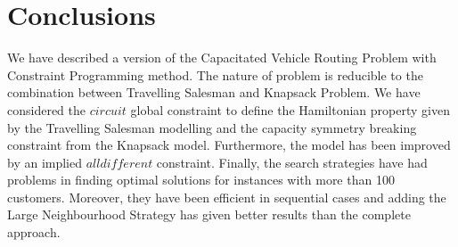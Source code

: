 \chapter{Conclusions}
We have described a version of the Capacitated Vehicle Routing Problem with Constraint Programming method. The nature of problem is reducible to the combination between Travelling Salesman and Knapsack Problem. We have considered the \begin{math} circuit \end{math} global constraint to define the Hamiltonian property given by the Travelling Salesman modelling and the capacity symmetry breaking constraint from the Knapsack model. Furthermore, the model has been improved by an implied \begin{math}alldifferent\end{math} constraint. Finally, the search strategies have had problems in finding optimal solutions for instances with more than 100 customers. Moreover, they have been efficient in sequential cases and adding the Large Neighbourhood Strategy has given better results than the complete approach. 

